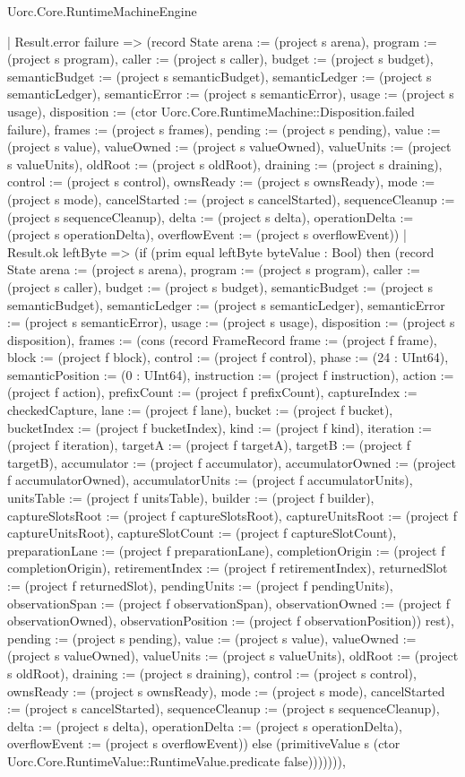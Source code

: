 \begin{lexlean}{Uorc.Core.RuntimeMachineEngine}
\begin{semanticmodule}
{        | Result.error failure => (record State {arena := (project s arena), program := (project s program), caller := (project s caller), budget := (project s budget), semanticBudget := (project s semanticBudget), semanticLedger := (project s semanticLedger), semanticError := (project s semanticError), usage := (project s usage), disposition := (ctor Uorc.Core.RuntimeMachine::Disposition.failed failure), frames := (project s frames), pending := (project s pending), value := (project s value), valueOwned := (project s valueOwned), valueUnits := (project s valueUnits), oldRoot := (project s oldRoot), draining := (project s draining), control := (project s control), ownsReady := (project s ownsReady), mode := (project s mode), cancelStarted := (project s cancelStarted), sequenceCleanup := (project s sequenceCleanup), delta := (project s delta), operationDelta := (project s operationDelta), overflowEvent := (project s overflowEvent)})
        | Result.ok leftByte => (if (prim equal leftByte byteValue : Bool) then (record State {arena := (project s arena), program := (project s program), caller := (project s caller), budget := (project s budget), semanticBudget := (project s semanticBudget), semanticLedger := (project s semanticLedger), semanticError := (project s semanticError), usage := (project s usage), disposition := (project s disposition), frames := (cons (record FrameRecord {frame := (project f frame), block := (project f block), control := (project f control), phase := (24 : UInt64), semanticPosition := (0 : UInt64), instruction := (project f instruction), action := (project f action), prefixCount := (project f prefixCount), captureIndex := checkedCapture, lane := (project f lane), bucket := (project f bucket), bucketIndex := (project f bucketIndex), kind := (project f kind), iteration := (project f iteration), targetA := (project f targetA), targetB := (project f targetB), accumulator := (project f accumulator), accumulatorOwned := (project f accumulatorOwned), accumulatorUnits := (project f accumulatorUnits), unitsTable := (project f unitsTable), builder := (project f builder), captureSlotsRoot := (project f captureSlotsRoot), captureUnitsRoot := (project f captureUnitsRoot), captureSlotCount := (project f captureSlotCount), preparationLane := (project f preparationLane), completionOrigin := (project f completionOrigin), retirementIndex := (project f retirementIndex), returnedSlot := (project f returnedSlot), pendingUnits := (project f pendingUnits), observationSpan := (project f observationSpan), observationOwned := (project f observationOwned), observationPosition := (project f observationPosition)}) rest), pending := (project s pending), value := (project s value), valueOwned := (project s valueOwned), valueUnits := (project s valueUnits), oldRoot := (project s oldRoot), draining := (project s draining), control := (project s control), ownsReady := (project s ownsReady), mode := (project s mode), cancelStarted := (project s cancelStarted), sequenceCleanup := (project s sequenceCleanup), delta := (project s delta), operationDelta := (project s operationDelta), overflowEvent := (project s overflowEvent)}) else (primitiveValue s (ctor Uorc.Core.RuntimeValue::RuntimeValue.predicate false))))))),
}
\end{semanticmodule}
\end{lexlean}
